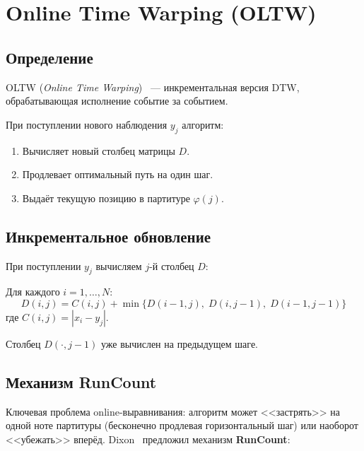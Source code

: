 \documentclass[a4paper,11pt]{article}
\begin{document}
\section{Online Time Warping (OLTW)}
\label{sec:oltw}

\subsection{Определение}

\begin{defbox}[title={Online Time Warping}]
OLTW (\emph{Online Time Warping})~\cite{dixon2005} --- инкрементальная
версия DTW, обрабатывающая исполнение событие за событием.

При поступлении нового наблюдения $y_j$ алгоритм:
\begin{enumerate}[leftmargin=1.5em]
  \item Вычисляет новый столбец матрицы $D$.
  \item Продлевает оптимальный путь на один шаг.
  \item Выдаёт текущую позицию в партитуре $\varphi(j)$.
\end{enumerate}
\end{defbox}

\subsection{Инкрементальное обновление}

При поступлении $y_j$ вычисляем $j$-й столбец $D$:

\begin{formulabox}[title={OLTW: обновление столбца}]
Для каждого $i = 1, \ldots, N$:
\[
  D(i,j) = C(i,j) + \min\bigl\{D(i-1,j),\; D(i,j-1),\; D(i-1,j-1)\bigr\}
\]
где $C(i,j) = |x_i - y_j|$.

Столбец $D(\cdot, j-1)$ уже вычислен на предыдущем шаге.
\end{formulabox}

\subsection{Механизм RunCount}

Ключевая проблема online-выравнивания: алгоритм может <<застрять>>
на одной ноте партитуры (бесконечно продлевая горизонтальный шаг)
или наоборот <<убежать>> вперёд. Dixon~\cite{dixon2005} предложил
механизм \textbf{RunCount}:
\end{document}
